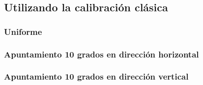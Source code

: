 \subsection{Utilizando la calibración clásica}

\subsubsection{Uniforme}

\subsubsection{Apuntamiento 10 grados en dirección horizontal}

\subsubsection{Apuntamiento 10 grados en dirección vertical}


